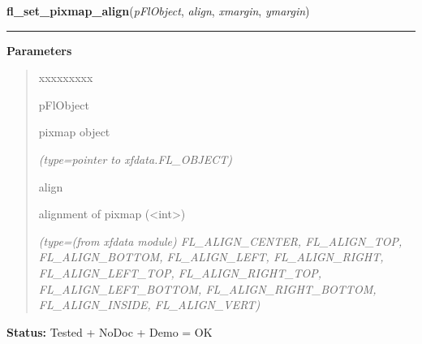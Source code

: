     \label{xformslib:flbitmap:fl_set_pixmap_align}

    \vspace{0.5ex}

\hspace{.8\funcindent}\begin{boxedminipage}{\funcwidth}

    \raggedright \textbf{fl\_set\_pixmap\_align}(\textit{pFlObject}, \textit{align}, \textit{xmargin}, \textit{ymargin})

    \vspace{-1.5ex}

    \rule{\textwidth}{0.5\fboxrule}
\setlength{\parskip}{2ex}
\setlength{\parskip}{1ex}
      \textbf{Parameters}
      \vspace{-1ex}

      \begin{quote}
        \begin{Ventry}{xxxxxxxxx}

          \item[pFlObject]

          pixmap object

            {\it (type=pointer to xfdata.FL\_OBJECT)}

          \item[align]

          alignment of pixmap ({\textless}int{\textgreater})

            {\it (type=(from xfdata module) FL\_ALIGN\_CENTER, FL\_ALIGN\_TOP, FL\_ALIGN\_BOTTOM, 
FL\_ALIGN\_LEFT, FL\_ALIGN\_RIGHT, FL\_ALIGN\_LEFT\_TOP, 
FL\_ALIGN\_RIGHT\_TOP, FL\_ALIGN\_LEFT\_BOTTOM, FL\_ALIGN\_RIGHT\_BOTTOM, 
FL\_ALIGN\_INSIDE, FL\_ALIGN\_VERT)}

        \end{Ventry}

      \end{quote}

\textbf{Status:} Tested + NoDoc + Demo = OK



    \end{boxedminipage}

    \label{xformslib:flbitmap:fl_set_pixmap_align}

